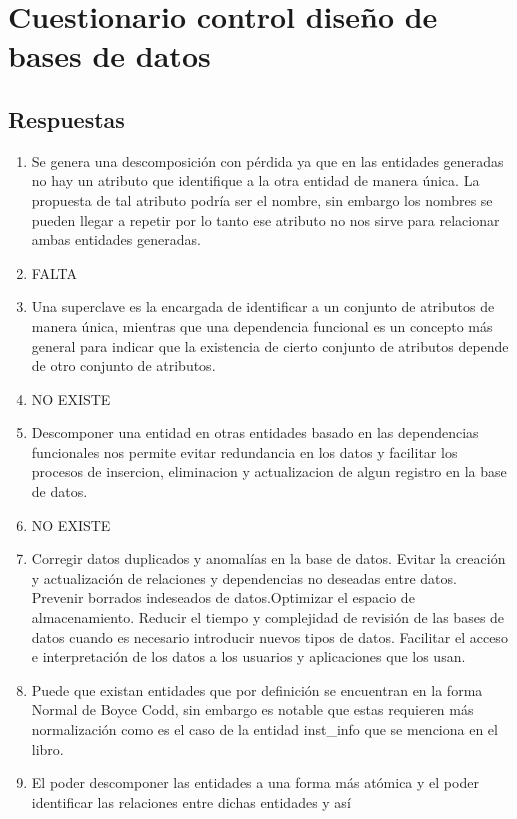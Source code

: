 \documentclass[twoside]{article}
\begin{document}
\selectfont
\newpage
\section*{\centering Cuestionario control diseño de bases de datos}
\subsection*{Respuestas}
\begin{enumerate}
      \item Se genera una descomposición con pérdida ya que en las entidades generadas no hay un atributo que
            identifique a la otra entidad de manera única. La propuesta de tal atributo podría ser el nombre, sin embargo
            los nombres se pueden llegar a repetir por lo tanto ese atributo no nos sirve para relacionar ambas entidades generadas.
      \item FALTA
      \item Una superclave es la encargada de identificar a un conjunto de atributos de manera única, mientras
            que una dependencia funcional es un concepto más general para indicar que la existencia de cierto conjunto
            de atributos depende de otro conjunto de atributos.
      \item NO EXISTE
      \item Descomponer una entidad en otras entidades basado en las dependencias funcionales nos permite evitar redundancia
            en los datos y facilitar los procesos de insercion, eliminacion y actualizacion de algun registro en la base de datos.
      \item NO EXISTE
      \item Corregir datos duplicados y anomalías en la base de datos. Evitar la creación y actualización de relaciones y dependencias
            no deseadas entre datos. Prevenir borrados indeseados de datos.Optimizar el espacio de almacenamiento.
            Reducir el tiempo y complejidad de revisión de las bases de datos cuando es necesario introducir nuevos tipos de datos.
            Facilitar el acceso e interpretación de los datos a los usuarios y aplicaciones que los usan.
      \item Puede que existan entidades que por definición se encuentran en la forma Normal de Boyce Codd, sin embargo es notable que
            estas requieren más normalización como es el caso de la entidad inst\_info que se menciona en el libro.
      \item El poder descomponer las entidades a una forma más atómica y el poder identificar las relaciones entre dichas entidades y así

\end{enumerate}
\end{document}
